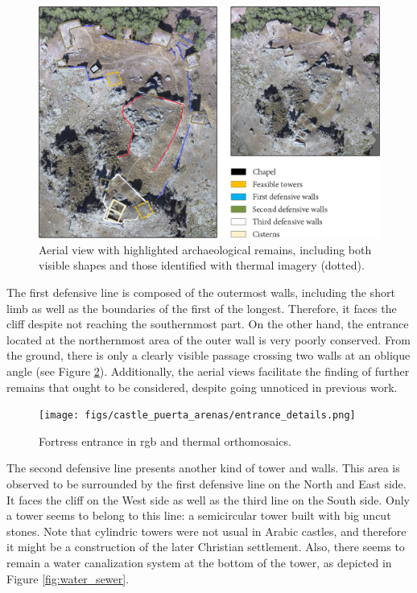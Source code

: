 \begin{figure}[htbp]
    \centering
    \includegraphics[width=\linewidth]{figs/castle_puerta_arenas/castle_annotations.png}
    \caption{Aerial view with highlighted archaeological remains, including both visible shapes and those identified with thermal imagery (dotted). }
    \label{fig:archaeological_remains_structure}
\end{figure}

The first defensive line is composed of the outermost walls, including the short limb as well as the boundaries of the first of the longest. Therefore, it faces the cliff despite not reaching the southernmost part. On the other hand, the entrance located at the northernmost area of the outer wall is very poorly conserved. From the ground, there is only a clearly visible passage crossing two walls at an oblique angle (see Figure \ref{fig:entrance_details}). Additionally, the aerial views facilitate the finding of further remains that ought to be considered, despite going unnoticed in previous work. 

\begin{figure}[htbp]
    \centering
    \texttt{[image: figs/castle\_puerta\_arenas/entrance\_details.png]}
    \caption{Fortress entrance in \acrshort{rgb} and thermal orthomosaics.}
    \label{fig:entrance_details}
\end{figure}

The second defensive line presents another kind of tower and walls. This area is observed to be surrounded by the first defensive line on the North and East side. It faces the cliff on the West side as well as the third line on the South side. Only a tower seems to belong to this line: a semicircular tower built with big uncut stones. Note that cylindric towers were not usual in Arabic castles, and therefore it might be a construction of the later Christian settlement. Also, there seems to remain a water canalization system at the bottom of the tower, as depicted in Figure \ref{fig:water_sewer}.

